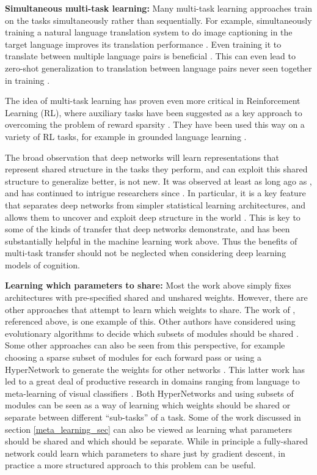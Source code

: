 \textbf{Simultaneous multi-task learning:} Many multi-task learning approaches train on the tasks simultaneously rather than sequentially. For example, simultaneously training a natural language translation system to do image captioning in the target language improves its translation performance \citep{Luong2016}. Even training it to translate between multiple language pairs is beneficial \citep{Dong2015}. This can even lead to zero-shot generalization to translation between language pairs never seen together in training \citep{Johnson2016a, Platanios2017}. \par 
The idea of multi-task learning has proven even more critical in Reinforcement Learning (RL), where auxiliary tasks have been suggested as a key approach to overcoming the problem of reward sparsity \citep[e.g.][]{LeCun2016}. They have been used this way on a variety of RL tasks, for example in grounded language learning \citep{Hermann2017}. \par
The broad observation that deep networks will learn representations that represent shared structure in the tasks they perform, and can exploit this shared structure to generalize better, is not new. It was observed at least as long ago as \citet{Hinton1986}, and has continued to intrigue researchers since \citep[e.g.][]{Lampinen2017a}. In particular, it is a key feature that separates deep networks from simpler statistical learning architectures, and allows them to uncover and exploit deep structure in the world \citep{Rogers2008}. This is key to some of the kinds of transfer that deep networks demonstrate, and has been substantially helpful in the machine learning work above. Thus the benefits of multi-task transfer should not be neglected when considering deep learning models of cognition. \par 

\textbf{Learning which parameters to share:} Most the work above simply fixes architectures with pre-specified shared and unshared weights. However, there are other approaches that attempt to learn which weights to share. The work of \citet{Achille2018a}, referenced above, is one example of this.  Other authors have considered using evolutionary algorithms to decide which subsets of modules should be shared \citep{Fernando2017}. Some other approaches can also be seen from this perspective, for example choosing a sparse subset of modules for each forward pass \citep{Shazeer2017} or using a HyperNetwork to generate the weights for other networks \citep{Ha2016}. This latter work has led to a great deal of productive research in domains ranging from language \citep{Platanios2017} to meta-learning of visual classifiers \citep{Garnelo2018, Li2019a}. Both HyperNetworks and using subsets of modules can be seen as a way of learning which weights should be shared or separate between different ``sub-tasks'' of a task. Some of the work discussed in section \ref{meta_learning_sec} can also be viewed as learning what parameters should be shared and which should be separate. While in principle a fully-shared network could learn which parameters to share just by gradient descent, in practice a more structured approach to this problem can be useful. \par 

